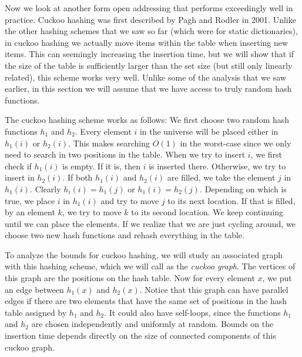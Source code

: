 Now we look at another form open addressing that performs exceedingly well in
practice. Cuckoo hashing was first described by Pagh and Rodler in 2001. Unlike
the other hashing schemes that we saw so far (which were for static
dictionaries), in cuckoo hashing we actually move items within the table when
inserting new items. This can seemingly increasing the insertion time, but we
will show that if the size of the table is sufficiently larger than the set size
(but still only linearly related), this scheme works very well.  Unlike some of the analysis that we
saw earlier, in this section we will assume that we have access to truly random
hash functions.

The cuckoo hashing scheme works as follows: We first choose two random hash
functions $h_1$ and $h_2$. Every element $i$ in the universe will be placed
either in $h_1(i)$ or $h_2(i)$. This makes searching $O(1)$ in the worst-case
since we only need to search in two positions in the table. When we try to
insert $i$, we first check if $h_1(i)$ is empty. If it is, then $i$ is inserted
there. Otherwise, we try to insert in $h_2(i)$. If both $h_1(i)$ and $h_2(i)$
are filled, we take the element $j$ in $h_1(i)$. Clearly $h_i(i) = h_1(j)$ or
$h_1(i) = h_2(j)$. Depending on which is true, we place $i$ in $h_1(i)$ and try
to move $j$ to its next location.  If that is filled, by an element $k$, we try
to move $k$ to its second location. We keep continuing until we can place the
elements. If we realize that we are just cycling around, we choose two new hash
functions and rehash everything in the table.

To analyze the bounds for cuckoo hashing, we will study an associated graph with
this hashing scheme, which we will call as the \emph{cuckoo graph}. The vertices
of this graph are the positions on the hash table. Now for every element $x$, we
put an edge between $h_1(x)$ and $h_2(x)$. Notice that this graph can have
parallel edges if there are two elements that have the same set of positions in
the hash table assigned by $h_1$ and $h_2$. It could also have self-loops, since
the functions $h_1$ and $h_2$ are chosen independently and uniformly at
random. Bounds on the insertion time depends directly on the size of connected
components of this cuckoo graph.


